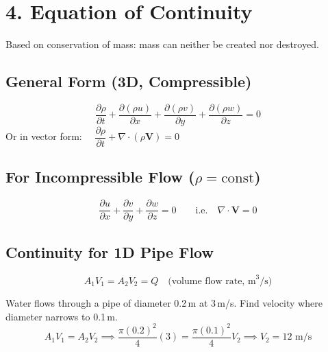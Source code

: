 \documentclass[12pt]{article}
\begin{document}
\section{4. Equation of Continuity}

\begin{defbox}
Based on conservation of mass: mass can neither be created nor destroyed.
\end{defbox}

\subsection{General Form (3D, Compressible)}

\begin{formulabox}
\[
  \frac{\partial \rho}{\partial t} + \frac{\partial(\rho u)}{\partial x} + \frac{\partial(\rho v)}{\partial y} + \frac{\partial(\rho w)}{\partial z} = 0
\]
Or in vector form: $\quad \dfrac{\partial \rho}{\partial t} + \nabla \cdot (\rho \mathbf{V}) = 0$
\end{formulabox}

\subsection{For Incompressible Flow ($\rho = \text{const}$)}

\begin{formulabox}
\[
  \frac{\partial u}{\partial x} + \frac{\partial v}{\partial y} + \frac{\partial w}{\partial z} = 0
  \qquad \text{i.e.} \quad \nabla \cdot \mathbf{V} = 0
\]
\end{formulabox}

\subsection{Continuity for 1D Pipe Flow}

\begin{formulabox}
\[
  A_1 V_1 = A_2 V_2 = Q \quad \text{(volume flow rate, m}^3\text{/s)}
\]
\end{formulabox}

\begin{examplebox*}
Water flows through a pipe of diameter 0.2\,m at 3\,m/s. Find velocity where diameter narrows to 0.1\,m.
\[
  A_1V_1 = A_2V_2 \implies \frac{\pi(0.2)^2}{4}(3) = \frac{\pi(0.1)^2}{4}V_2 \implies V_2 = 12 \text{ m/s}
\]
\end{examplebox*}
\end{document}
